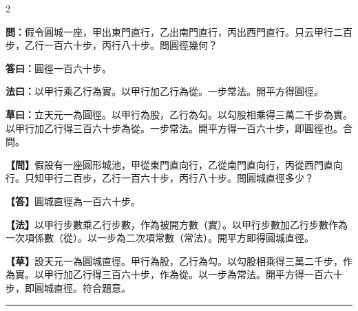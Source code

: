 \documentclass[11pt,a4paper]{article}
\newcommand{\longline}{\noindent\rule{\textwidth}{0.4pt}}
\newcommand{\wenC}[1]{\par\noindent\textbf{\textcolor{probcolor}{問：}}{#1}\par}
\newcommand{\daC}[1]{\par\noindent\textbf{\textcolor{anscolor}{答曰：}}{#1}\par}
\newcommand{\fayueC}[1]{\par\noindent\textbf{\textcolor{methodcolor}{法曰：}}{#1}\par}
\newcommand{\caoyueC}[1]{\par\noindent\textbf{草曰：}{#1}\par}
\newcommand{\wenM}[1]{\par\noindent\textbf{\textcolor{probcolor}{【問】}}{#1}\par}
\newcommand{\daM}[1]{\par\noindent\textbf{\textcolor{anscolor}{【答】}}{#1}\par}
\newcommand{\fayueM}[1]{\par\noindent\textbf{\textcolor{methodcolor}{【法】}}{#1}\par}
\newcommand{\caoyueM}[1]{\par\noindent\textbf{【草】}{#1}\par}
\begin{document}
\begin{paracol}{2}

\wenC{假令圓城一座，甲出東門直行，乙出南門直行，丙出西門直行。只云甲行二百步，乙行一百六十步，丙行八十步。問圓徑幾何？}

\daC{圓徑一百六十步。}

\fayueC{以甲行乘乙行為實。以甲行加乙行為從。一步常法。開平方得圓徑。}

\caoyueC{立天元一為圓徑。以甲行為股，乙行為勾。以勾股相乘得三萬二千步為實。以甲行加乙行得三百六十步為從。一步常法。開平方得一百六十步，即圓徑也。合問。}

\switchcolumn

\wenM{假設有一座圓形城池，甲從東門直向行，乙從南門直向行，丙從西門直向行。只知甲行二百步，乙行一百六十步，丙行八十步。問圓城直徑多少？}

\daM{圓城直徑為一百六十步。}

\fayueM{以甲行步數乘乙行步數，作為被開方數（實）。以甲行步數加乙行步數作為一次項係數（從）。以一步為二次項常數（常法）。開平方即得圓城直徑。}

\caoyueM{設天元一為圓城直徑。甲行為股，乙行為勾。以勾股相乘得三萬二千步，作為實。以甲行加乙行得三百六十步，作為從。以一步為常法。開平方得一百六十步，即圓城直徑。符合題意。}

\end{paracol}

\vspace{0.3cm}
\longline
\end{document}
